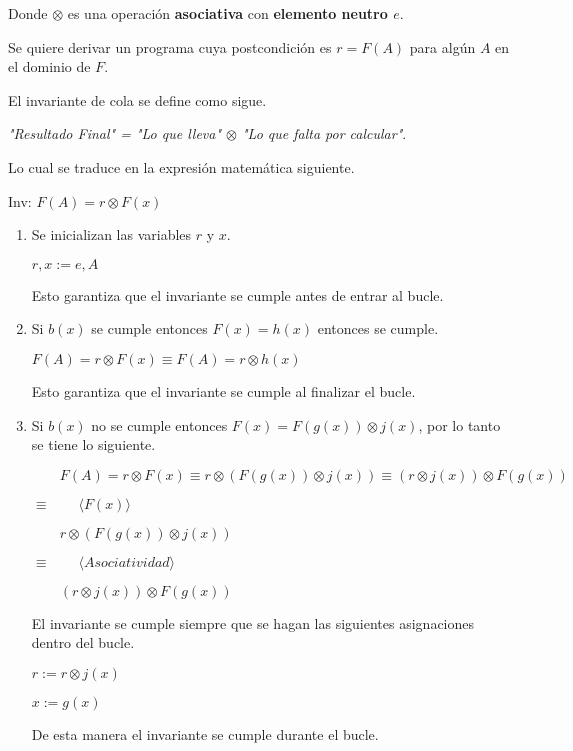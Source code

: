 \documentclass[hidelinks]{article}
\begin{document}
Donde $\otimes$ es una operación \textbf{asociativa} con \textbf{elemento
	neutro $e$}.\par

Se quiere derivar un programa cuya postcondición es $r = F(A)$ para algún $A$
en el dominio de $F$.\par

El invariante de cola se define como sigue.\par

\textit{"Resultado Final" = "Lo que lleva" $\otimes$ "Lo que falta por calcular"}.\par

Lo cual se traduce en la expresión matemática siguiente.\par

\begin{center}
	Inv: $F(A) = r \otimes F(x)$
\end{center}

\begin{enumerate}
	\item Se inicializan las variables $r$ y $x$.\par
	      $r, x := e, A$\par
	      Esto garantiza que el invariante se cumple antes de entrar al bucle.

	\item Si $b(x)$ se cumple entonces $F(x) = h(x)$ entonces se cumple.\par
	      $F(A) = r \otimes F(x) \equiv F(A) = r \otimes h(x)$\par
	      Esto garantiza que el invariante se cumple al finalizar el bucle.\par

	\item Si $b(x)$ no se cumple entonces $F(x) = F(g(x)) \otimes j(x)$, por lo tanto se
	      tiene lo siguiente.\par
	      $\qquad F(A) = r \otimes F(x) \equiv r \otimes (F(g(x)) \otimes j(x)) \equiv (r \otimes j(x)) \otimes F(g(x))$\par
	      $\equiv \qquad \langle F(x) \rangle$\par
	      $\qquad r \otimes (F(g(x)) \otimes j(x))$\par
	      $\equiv \qquad \langle Asociatividad \rangle$\par
	      $\qquad (r \otimes j(x)) \otimes F(g(x))$\par
	      El invariante se cumple siempre que se hagan las siguientes asignaciones dentro
	      del bucle.\par
	      \begin{center}
		      $r := r \otimes j(x)$\par
		      $x := g(x)$\par
	      \end{center}
	      De esta manera el invariante se cumple durante el bucle.\par
\end{enumerate}
\end{document}
